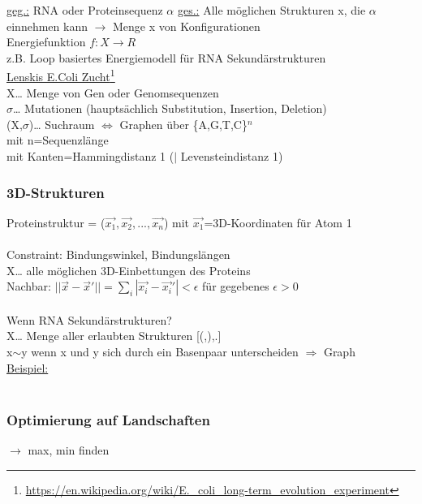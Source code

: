 \underline{geg.:} RNA oder Proteinsequenz $\alpha$
\underline{ges.:} Alle möglichen Strukturen x, die $\alpha$ einnehmen kann $\rightarrow$ Menge x von Konfigurationen\\
Energiefunktion $f: X \rightarrow R$\\
z.B. Loop basiertes Energiemodell für RNA Sekundärstrukturen\\


\underline{Lenskis E.Coli Zucht\footnote{\url{https://en.wikipedia.org/wiki/E._coli_long-term_evolution_experiment}}}\\
X… Menge von Gen oder Genomsequenzen\\
$\sigma$… Mutationen (hauptsächlich Substitution, Insertion, Deletion)\\
(X,$\sigma$)… Suchraum $\Leftrightarrow$ Graphen über \{A,G,T,C\}$^n$\\
mit n=Sequenzlänge\\
mit Kanten=Hammingdistanz 1 ($|$ Levensteindistanz 1)

\subsubsection{3D-Strukturen}
Proteinstruktur = ($\overrightarrow{x_1}, \overrightarrow{x_2}, ... , \overrightarrow{x_n}$) mit $\overrightarrow{x_1}$=3D-Koordinaten für Atom 1\\
\\
Constraint: Bindungswinkel, Bindungslängen\\
X… alle möglichen 3D-Einbettungen des Proteins\\
Nachbar: $||\overrightarrow{x} - \overrightarrow{x}'|| = \sum_{i} |\overrightarrow{x_i} - \overrightarrow{x_i}' | < \epsilon$ für gegebenes $\epsilon > 0$\\\\

Wenn RNA Sekundärstrukturen?\\
X… Menge aller erlaubten Strukturen [(,),.]\\
x$\sim$y wenn x und y sich durch ein Basenpaar unterscheiden $\Rightarrow$ Graph\\

\underline{Beispiel:}\\\\

\subsubsection{Optimierung auf Landschaften}
$\rightarrow$ max, min finden\\

